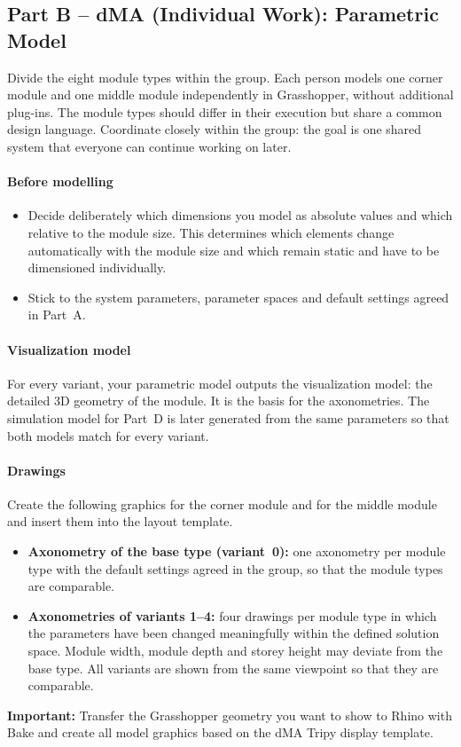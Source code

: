 \subsection{Part B – dMA (Individual Work): Parametric Model}
Divide the eight module types within the group. Each person models one corner module and one middle module independently in Grasshopper, without additional plug-ins. The module types should differ in their execution but share a common design language. Coordinate closely within the group: the goal is one shared system that everyone can continue working on later.

\paragraph{Before modelling}
\begin{itemize}
  \item Decide deliberately which dimensions you model as absolute values and which relative to the module size. This determines which elements change automatically with the module size and which remain static and have to be dimensioned individually.
  \item Stick to the system parameters, parameter spaces and default settings agreed in Part~A.
\end{itemize}
\paragraph{Visualization model}
For every variant, your parametric model outputs the visualization model: the detailed 3D geometry of the module. It is the basis for the axonometries. The simulation model for Part~D is later generated from the same parameters so that both models match for every variant.
\paragraph{Drawings}
Create the following graphics for the corner module and for the middle module and insert them into the layout template.
\begin{itemize}
  \item \textbf{Axonometry of the base type (variant~0):} one axonometry per module type with the default settings agreed in the group, so that the module types are comparable.
  \item \textbf{Axonometries of variants 1–4:} four drawings per module type in which the parameters have been changed meaningfully within the defined solution space. Module width, module depth and storey height may deviate from the base type. All variants are shown from the same viewpoint so that they are comparable.
\end{itemize}
\textbf{Important:} Transfer the Grasshopper geometry you want to show to Rhino with Bake and create all model graphics based on the dMA Tripy display template.
